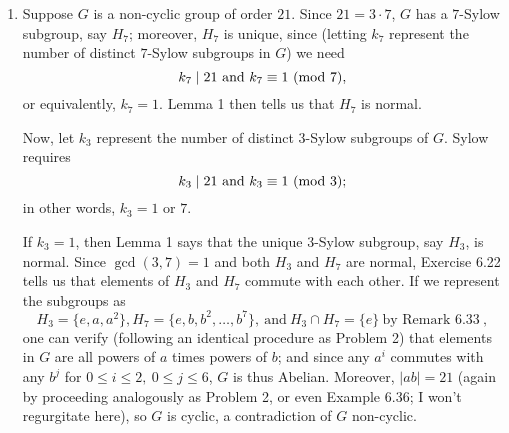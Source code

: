 \documentclass{homework}
\begin{document}
\begin{solution}
\begin{enumerate}[label=(\alph*)]
\begin{proof}[Proof]
        Thus, $gH_pg^{-1}$ is a subgroup of $H$ for any $g\in G$; moreover, $gH_pg^{-1}$ has the same
        order as $H_p$, namely $p$. However, since $H_p$ is a normal $p$-Sylow subgroup of $H$---and
        thus unique, by Lemma 1---we need $H_p=gH_pg^{-1}$. Since the choice of $g\in G$ was arbitrary,
        $H_p$ is thus a normal $p$-Sylow subgroup of $G$ as well.
      \end{proof}
      
       

      Now, suppose $G$ is a group of order $60$ with a normal $3$-Sylow subgroup, say $H_3$. Then the
      group $G /H_3$ is well-defined, and by Lagrange it has order $20$. Since $5\mid 20$, Sylow's
      theorem tells us that $G /H_3$ has a $5$-Sylow subgroup, say $H_5'$. By Sylow's theorem, if $k$
      represents the number of $5$-Sylow subgroups of $G /H_3$, we must also have \[
        k\mid 20~\text{and}~k\equiv 1\Mod{5}
      ;\] in other words, $k=1$, and $H_5'$ is unique and thus normal, by Lemma 1. But then Lemma 2
      tells us that $G$ has a normal subgroup of order $15$, say $H_{15}$; applying Sylow's again gives
      a normal $5$-Sylow subgroup $H_5$ of $H_{15}$. Lemma 3 finally tells us that $H_5$ is a normal
      $5$-Sylow subgroup in $G$, as desired.

      Therefore, if $G$ is a group of order $60$ that has a normal $3$-Sylow subgroup, then $G$ also has
      a normal $5$-Sylow subgroup.
    \item Suppose $G$ is a non-cyclic group of order $21$. Since $21=3\cdot 7$, $G$ has a $7$-Sylow
      subgroup, say $H_7$; moreover, $H_7$ is unique, since (letting $k_7$ represent the number of
      distinct $7$-Sylow subgroups in $G$) we need \[
        k_7\mid 21~\text{and}~k_7\equiv 1\ (\mathrm{mod}\ 7)
      ,\] or equivalently, $k_7=1$. Lemma 1 then tells us that $H_7$ is normal.

      Now, let $k_3$ represent the number of distinct $3$-Sylow subgroups of $G$. Sylow requires \[
        k_3\mid 21~\text{and}~k_3\equiv 1\ (\mathrm{mod}\ 3)
      ;\] in other words, $k_3=1$ or $7$.

      If $k_3=1$, then Lemma 1 says that the unique $3$-Sylow subgroup, say $H_3$, is normal. Since
      $\gcd{(3,7)}=1$ and both $H_3$ and $H_7$ are normal, Exercise 6.22 tells us that elements of
      $H_3$ and $H_7$ commute with each other. If we represent the subgroups as \[
        H_3=\{ e,a,a^2 \},H_7=\{ e,b,b^2,\ldots,b^7 \}, ~\text{and}~H_3\cap H_7=\{ e \}~\text{by
        Remark 6.33}~
      ,\] one can verify (following an identical procedure as Problem 2) that elements in $G$ are
      all powers of $a$ times powers of $b$; and since any $a^i$ commutes with any $b^j$ for $0\le
      i\le 2,\ 0\le j\le 6$, $G$ is thus Abelian. Moreover, $\left| ab \right| =21$ (again by
      proceeding analogously as Problem 2, or even Example 6.36; I won't regurgitate here), so $G$
      is cyclic, a contradiction of $G$ non-cyclic.


\end{enumerate}
\end{solution}
\end{document}
